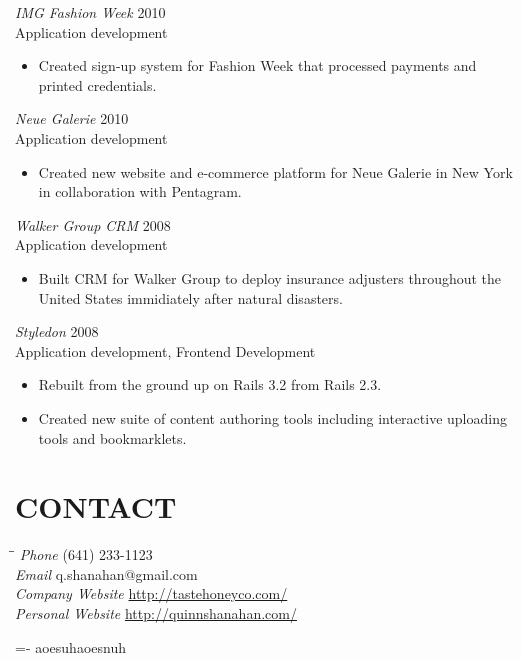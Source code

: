 \documentclass[line,margin]{res}
\begin{document}
\begin{resume}
    {\sl IMG Fashion Week}
    \hfill 2010 \\
    Application development
    \begin{itemize} \itemsep -2pt
        \item
            Created sign-up system for Fashion Week that processed payments
            and printed credentials.
    \end{itemize}

    {\sl Neue Galerie}
    \hfill 2010 \\
    Application development
    \begin{itemize} \itemsep -2pt
        \item
            Created new website and e-commerce platform for Neue Galerie in New York
            in collaboration with Pentagram.
    \end{itemize}

    \begin{samepage}
    {\sl Walker Group CRM}
    \hfill 2008 \\
    Application development
    \begin{itemize} \itemsep -2pt
        \item
            Built CRM for Walker Group to deploy insurance adjusters throughout the United
            States immidiately after natural disasters.
    \end{itemize}
    \end{samepage}

    {\sl Styledon}
    \hfill 2008 \\
    Application development, Frontend Development
    \begin{itemize} \itemsep -2pt
        \item
            Rebuilt from the ground up on Rails 3.2 from Rails 2.3.
        \item
            Created new suite of content authoring tools including interactive uploading tools
            and bookmarklets.
    \end{itemize}

\section{CONTACT}
    \vspace{-2.3ex}
    \begin{tabbing}
    \hspace{1.5in}\= \hspace{2.0in}\= \kill
    {\sl Phone}
        \> (641) 233-1123 \\
    {\sl Email}
        \> q.shanahan@gmail.com \\
    {\sl Company Website}
        \> \url{http://tastehoneyco.com/} \\
    {\sl Personal Website}
        \> \url{http://quinnshanahan.com/} \\
    \end{tabbing}

\vfill
\leftskip=-\hoffset
aoesuhaoesnuh

\end{resume}
\end{document}
